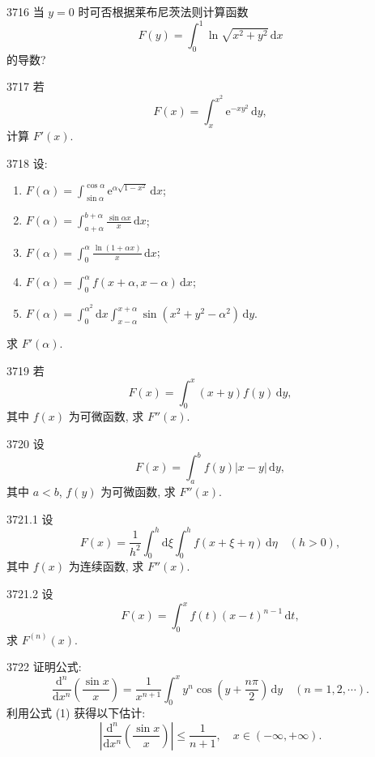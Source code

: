 \begin{prob}[M]{3716}
当 $y = 0$ 时可否根据莱布尼茨法则计算函数
\[
F(y) = \int_0^1 \ln \sqrt{x^2 + y^2} \,\mathrm{d}x
\]
的导数?
\end{prob}

\begin{prob}[M]{3717}
若
\[
F(x) = \int_x^{x^2} \mathrm{e}^{-x y^2} \,\mathrm{d}y,
\]
计算 $F'(x)$.
\end{prob}

\begin{prob}[L]{3718}
设:
\begin{enumerate}[label=(\alph*), itemsep=2pt, topsep=3pt]
\item $\displaystyle F(\alpha) = \int_{\sin \alpha}^{\cos \alpha} \mathrm{e}^{\alpha \sqrt{1 - x^2}} \,\mathrm{d}x$;
\item $\displaystyle F(\alpha) = \int_{a+\alpha}^{b+\alpha} \frac{\sin \alpha x}{x} \,\mathrm{d}x$;
\item $\displaystyle F(\alpha) = \int_0^\alpha \frac{\ln(1 + \alpha x)}{x} \,\mathrm{d}x$;
\item $\displaystyle F(\alpha) = \int_0^\alpha f(x + \alpha, x - \alpha) \,\mathrm{d}x$;
\item $\displaystyle F(\alpha) = \int_0^{\alpha^2} \mathrm{d}x \int_{x-\alpha}^{x+\alpha} \sin(x^2 + y^2 - \alpha^2) \,\mathrm{d}y$.
\end{enumerate}
求 $F'(\alpha)$.
\end{prob}

\begin{prob}[M]{3719}
若
\[
F(x) = \int_0^x (x + y) f(y) \,\mathrm{d}y,
\]
其中 $f(x)$ 为可微函数, 求 $F''(x)$.
\end{prob}

\begin{prob}[M]{3720}
设
\[
F(x) = \int_a^b f(y) |x - y| \,\mathrm{d}y,
\]
其中 $a < b$, $f(y)$ 为可微函数, 求 $F''(x)$.
\end{prob}

\begin{prob}[M]{3721.1}
设
\[
F(x) = \frac{1}{h^2} \int_0^h \mathrm{d}\xi \int_0^h f(x + \xi + \eta) \,\mathrm{d}\eta \quad (h > 0),
\]
其中 $f(x)$ 为连续函数, 求 $F''(x)$.
\end{prob}

\begin{prob}[M]{3721.2}
设
\[
F(x) = \int_0^x f(t)(x - t)^{n-1} \,\mathrm{d}t,
\]
求 $F^{(n)}(x)$.
\end{prob}

\begin{prob}[L]{3722}
证明公式:
\[
\frac{\mathrm{d}^n}{\mathrm{d}x^n} \left( \frac{\sin x}{x} \right) = \frac{1}{x^{n+1}} \int_0^x y^n \cos \left( y + \frac{n\pi}{2} \right) \,\mathrm{d}y \quad (n = 1, 2, \cdots). \tag{1}
\]
利用公式 (1) 获得以下估计:
\[
\left| \frac{\mathrm{d}^n}{\mathrm{d}x^n} \left( \frac{\sin x}{x} \right) \right| \leqslant \frac{1}{n + 1}, \quad x \in (-\infty, +\infty).
\]
\end{prob}

